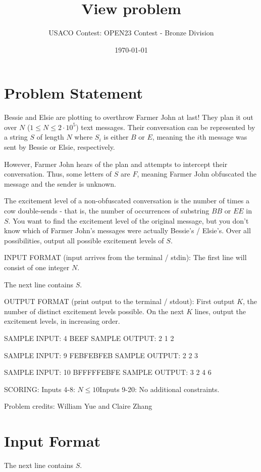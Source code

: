 \documentclass[12pt]{article}
\title{View problem}
\author{USACO Contest: OPEN23 Contest - Bronze Division}
\date{\today}
\begin{document}
\maketitle

\section*{Problem Statement}


Bessie and Elsie are plotting to overthrow Farmer John at last! They plan it out
over $N$ ($1\le N\le 2\cdot 10^5$) text messages. Their conversation can be
represented by a string $S$ of length $N$ where $S_i$ is either $B$ or $E$,
meaning the $i$th message was sent by Bessie or Elsie, respectively. 

However, Farmer John hears of the plan and attempts to intercept their
conversation. Thus, some letters of $S$ are $F$, meaning Farmer John obfuscated
the message and the sender is unknown.

The excitement level of a non-obfuscated conversation is the number of
times a cow double-sends - that is, the number of occurrences of substring $BB$
or $EE$ in $S$. You want to find the excitement level of the original message,
but you don’t know which of Farmer John’s messages were actually Bessie’s
/ Elsie’s. Over all possibilities, output all possible excitement levels of
$S$.

INPUT FORMAT (input arrives from the terminal / stdin):
The first line will consist of one integer $N$.

The next line contains $S$.

OUTPUT FORMAT (print output to the terminal / stdout):
First output $K$, the number of distinct excitement levels possible. On the next
$K$ lines, output the excitement levels, in increasing order.

SAMPLE INPUT:
4
BEEF
SAMPLE OUTPUT: 
2
1
2

SAMPLE INPUT:
9
FEBFEBFEB
SAMPLE OUTPUT: 
2
2
3

SAMPLE INPUT:
10
BFFFFFEBFE
SAMPLE OUTPUT: 
3
2
4
6

SCORING:
Inputs 4-8: $N\le 10$Inputs 9-20: No additional
constraints.


Problem credits: William Yue and Claire Zhang



\section*{Input Format}
The next line contains $S$.
\end{document}
